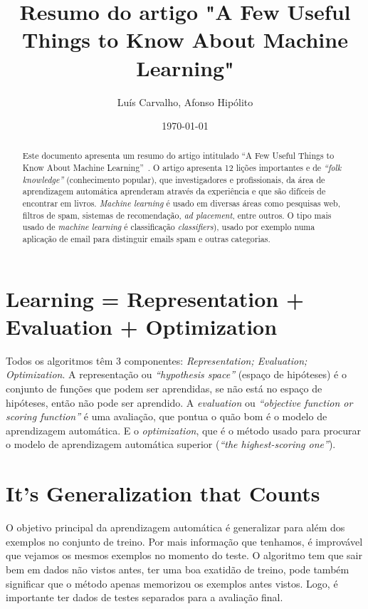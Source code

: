 \documentclass{article}
\title{Resumo do artigo "A Few Useful Things to Know About Machine Learning"}
\author{Luís Carvalho, Afonso Hipólito}
\date{\today}
\begin{document}
\maketitle

\begin{abstract}
Este documento apresenta um resumo do artigo intitulado ``A Few Useful
Things to Know About Machine Learning''~\cite{}. O artigo apresenta 12 lições importantes e de \emph{“folk knowledge”} (conhecimento popular), que investigadores e profissionais, da área de aprendizagem automática aprenderam através da experiência e que são difíceis de encontrar em livros.
\emph{Machine learning} é usado em diversas áreas como pesquisas web, filtros de spam, sistemas de recomendação, \emph{ad placement}, entre outros.
O tipo mais usado de \emph{machine learning} é classificação \emph{classifiers}), usado por exemplo numa aplicação de email para distinguir emails spam e outras categorias.

\end{abstract}

\section{Learning = Representation + Evaluation + Optimization}
Todos os algoritmos têm 3 componentes: \emph{Representation; Evaluation; Optimization}.
A representação ou \emph{“hypothesis space”} (espaço de hipóteses) é o conjunto de funções que podem ser aprendidas, se não está no espaço de hipóteses, então não pode ser aprendido.
A \emph{evaluation} ou \emph{“objective function or scoring function”} é uma avaliação, que pontua o quão bom é o modelo de aprendizagem automática.
E o \emph{optimization}, que é o método usado para procurar o modelo de aprendizagem automática superior (\emph{“the highest-scoring one”}).


\section{It’s Generalization that Counts}
O objetivo principal da aprendizagem automática é generalizar para além dos exemplos no conjunto de treino. Por mais informação que tenhamos, é improvável que vejamos os mesmos exemplos no momento do teste.
 O algoritmo tem que sair bem em dados não vistos antes, ter uma boa exatidão de treino, pode também significar que o método apenas memorizou os exemplos antes vistos.
Logo, é importante ter dados de testes separados para a avaliação final.
\end{document}

